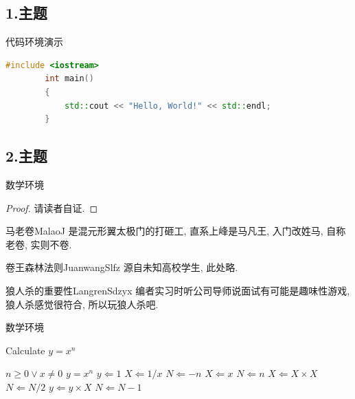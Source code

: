 \documentclass[12pt,hyperref,UTF8,aspectratio=169]{beamer}
\begin{document}
\subsection{1.主题}

\begin{frame}[fragile]{代码环境演示}
	\begin{lstlisting}[language=c++]
        #include <iostream>
        int main()
        {
            std::cout << "Hello, World!" << std::endl;
        }  
    \end{lstlisting}
\end{frame}

\subsection{2.主题}

\begin{frame}{数学环境}
	\begin{proof}{}
		请读者自证.
	\end{proof}
	\begin{definition}{马老卷}{MalaoJ}
		是混元形翼太极门的打砸工, 直系上峰是马凡王, 入门改姓马, 自称老卷, 实则不卷.
	\end{definition}
	\begin{lemma}{卷王森林法则}{JuanwangSlfz}
		源自未知高校学生, 此处略.
	\end{lemma}
	\begin{corollary}{狼人杀的重要性}{LangrenSdzyx}
		编者实习时听公司导师说面试有可能是趣味性游戏, 狼人杀感觉很符合, 所以玩狼人杀吧.
	\end{corollary}
\end{frame}


\begin{frame} {数学环境}
\begin{algorithm}[H]                           %
\caption{Calculate $y = x^n$}          %
\label{alg1}      %
\begin{algorithmic}  %
\REQUIRE $n \geq 0 \vee x \neq 0$
\ENSURE $y = x^n$
\STATE $y \Leftarrow 1$
\STATE $X \Leftarrow 1 / x$
\STATE $N \Leftarrow -n$
\ELSE
\STATE $X \Leftarrow x$
\STATE $N \Leftarrow n$
\ENDIF
{}
\STATE $X \Leftarrow X \times X$
\STATE $N \Leftarrow N / 2$
\ELSE[$N$ is odd]
\STATE $y \Leftarrow y \times X$
\STATE $N \Leftarrow N - 1$
\ENDIF
\ENDWHILE
\end{algorithmic}
\end{algorithm}
\end{frame}
\end{document}
